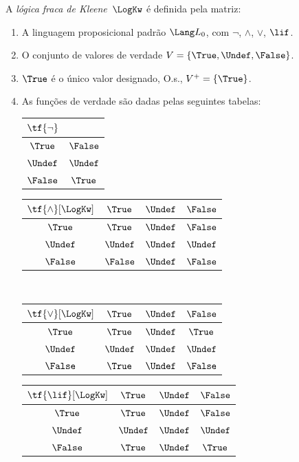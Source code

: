 \documentclass[../../../include/open-logic-section]{subfiles}
\begin{document}
\begin{defn}
A \emph{lógica fraca de Kleene}~$\LogKw$ é definida pela matriz:
\begin{enumerate}
  \item A linguagem proposicional padrão $\Lang L_0$, com
  $\lnot$, $\land$, $\lor$, $\lif$.
  \item O conjunto de valores de verdade $V = \{\True, \Undef, \False\}$.
  \item $\True$ é o único valor designado, O.s.\@, $V^+ = \{\True\}$.
  \item As funções de verdade são dadas pelas seguintes tabelas:
  \begin{center}
    \begin{tabular}{c|c} 
      $\tf{\lnot}$ & \\ 
      \hline  
      $\True$ & $\False$ \\ 
      $\Undef$ & $\Undef$ \\
      $\False$ & $\True$ 
    \end{tabular}
    \quad
    \begin{tabular}{c|ccc} 
      $\tf{\land}[\LogKw]$ & $\True$ & $\Undef$ & $\False$ \\ 
      \hline 
      $\True$ & $\True$ & $\Undef$ & $\False$ \\ 
      $\Undef$ & $\Undef$ & $\Undef$ & $\Undef$\\ 
      $\False$ & $\False$ & $\Undef$ & $\False$ 
    \end{tabular}
    \\[2ex]
    \begin{tabular}{c|ccc} 
      $\tf{\lor}[\LogKw]$ & $\True$ & $\Undef$ & $\False$ \\ 
      \hline 
      $\True$ & $\True$ & $\Undef$ & $\True$ \\ 
      $\Undef$ & $\Undef$ & $\Undef$ & $\Undef$ \\
      $\False$ & $\True$ & $\Undef$ & $\False$ 
    \end{tabular}
    \quad
    \begin{tabular}{c|ccc} 
      $\tf{\lif}[\LogKw]$ & $\True$ & $\Undef$ & $\False$ \\ 
      \hline 
      $\True$ & $\True$ & $\Undef$ & $\False$ \\ 
      $\Undef$ & $\Undef$ & $\Undef$ & $\Undef$  \\ 
      $\False$ & $\True$ & $\Undef$ & $\True$ 
    \end{tabular}
  \end{center} 
\end{enumerate}
\end{defn}
\end{document}
